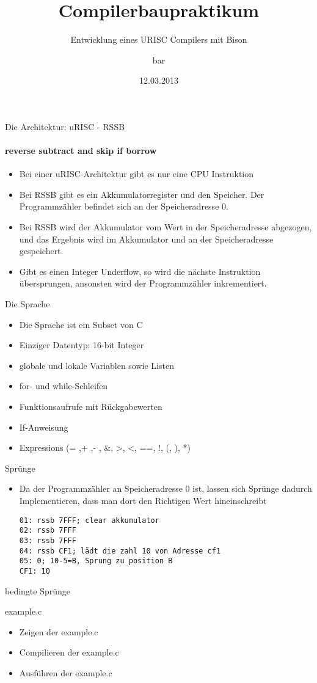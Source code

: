 \documentclass{beamer}
\title{Compilerbaupraktikum}
\subtitle{Entwicklung eines URISC Compilers mit Bison}
\author[foo]{bar}
\institute[IPS]{Institute for Programming and Reactive Systems}
\date{12.03.2013}
\begin{document}
\frame[plain]{\titlepage}


\begin{frame}{Die Architektur: uRISC - RSSB}
\framesubtitle{reverse subtract and skip if borrow}
\begin{itemize}
	\item Bei einer uRISC-Architektur gibt es nur eine CPU Instruktion
	\item Bei RSSB gibt es ein Akkumulatorregister und den Speicher. Der Programmzähler befindet sich an der Speicheradresse 0. 
	\item Bei RSSB wird der Akkumulator vom Wert in der Speicheradresse abgezogen, und das Ergebnis wird im Akkumulator und an der Speicheradresse gespeichert.
	\item Gibt es einen Integer Underflow, so wird die nächste Instruktion übersprungen, ansonsten wird der Programmzähler inkrementiert.
\end{itemize}
\end{frame}

\begin{frame}{Die Sprache}
\begin{itemize}
	\item Die Sprache ist ein Subset von C
	\item Einziger Datentyp: 16-bit Integer
	\item globale und lokale Variablen sowie Listen
	\item for- und while-Schleifen
	\item Funktionsaufrufe mit Rückgabewerten
	\item If-Anweisung
	\item Expressions (= ,+ ,- , \&, >, <, ==, !, (, ), *)
\end{itemize}
\end{frame}

\begin{frame}{Sprünge}
\begin{itemize}
	\item Da der Programmzähler an Speicheradresse 0 ist, lassen sich Sprünge dadurch Implementieren, dass man dort den Richtigen Wert hineinschreibt
	
	\texttt{01: rssb 7FFF; clear akkumulator}\\
	\texttt{02: rssb 7FFF}\\
	\texttt{03: rssb 7FFF}\\
	\texttt{04: rssb CF1; lädt die zahl 10 von Adresse cf1} \\
	\texttt{05: 0; 10-5=B, Sprung zu position B} \\
	\texttt{CF1: 10}
\end{itemize}
\end{frame}


\begin{frame}{bedingte Sprünge}
\end{frame}

\begin{frame}{example.c}
\begin{itemize}
	\item Zeigen der example.c
	\item Compilieren der example.c
	\item Ausführen der example.c
\end{itemize}
\end{frame}
\end{document}
